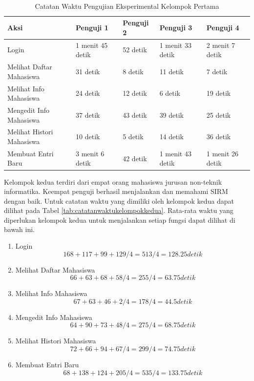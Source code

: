 \begin{center}
\begin{table}
\caption[Tabel 5-2 Catatan Waktu Pengujian Eksperimental Kelompok
Pertama]{Catatan Waktu Pengujian Eksperimental Kelompok Pertama}\\
\label{tab:catatanwaktukelompokpertama}
\begin{center}
\begin{tabular}{|p{3cm}|p{1.5cm}|p{1.5cm}|p{1.5cm}|p{1.5cm}|}
\hline
Aksi & Penguji 1 & Penguji 2 & Penguji 3 & Penguji 4\\
\hline
Login & 1 menit 45 detik & 52 detik & 1 menit 33 detik & 2 menit 7 detik\\
\hline
Melihat Daftar Mahasiswa & 31 detik & 8 detik & 11 detik & 7 detik\\
\hline
Melihat Info Mahasiswa & 24 detik & 12 detik & 6 detik & 19 detik\\
\hline
Mengedit Info Mahasiswa & 37 detik & 43 detik & 39 detik & 25 detik\\
\hline
Melihat Histori Mahasiswa & 10 detik & 5 detik & 14 detik & 36 detik\\
\hline
Membuat Entri Baru & 3 menit 6 detik & 42 detik & 1 menit 43 detik & 1 menit
26 detik\\
\hline
\end{tabular}
\end{center}
\end{table}
\end{center}

Kelompok kedua terdiri dari empat orang mahasiswa jurusan non-teknik
informatika. Keempat penguji berhasil menjalankan dan memahami SIRM dengan baik.
Untuk catatan waktu yang dimiliki oleh kelompok kedua dapat dilihat pada Tabel
\ref{tab:catatanwaktukelompokkedua}. Rata-rata waktu yang diperlukan
kelompok kedua untuk menjalankan setiap fungsi dapat dilihat di bawah ini.
\begin{enumerate}[1]
  \item Login\\
  $$168 + 117 + 99 + 129 / 4 = 513 / 4 = 128.25 detik$$
  \item Melihat Daftar Mahasiswa
  $$66 + 63 + 68 + 58 / 4 = 255 / 4 = 63.75 detik$$
  \item Melihat Info Mahasiswa
  $$67 + 63 + 46 + 2 / 4 = 178 / 4 = 44.5 detik$$
  \item Mengedit Info Mahasiswa
  $$64 + 90 + 73 + 48 / 4 = 275 / 4 = 68.75 detik$$
  \item Melihat Histori Mahasiswa
  $$72 + 66 + 94 + 67 / 4 = 299 / 4 = 74.75 detik$$
  \item Membuat Entri Baru
  $$68 + 138 + 124 + 205 / 4 = 535 / 4 = 133.75 detik$$
\end{enumerate}

